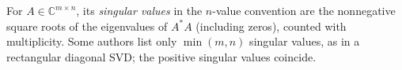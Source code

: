 
For $A\in\mathbb C^{m\times n}$, its \emph{singular values} in the $n$-value convention are the nonnegative square roots of the eigenvalues of $A^*A$ (including zeros), counted with multiplicity. Some authors list only $\min(m,n)$ singular values, as in a rectangular diagonal SVD; the positive singular values coincide.

